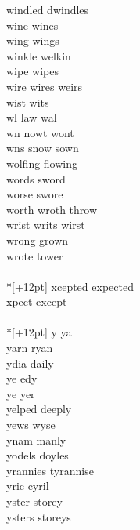 windled dwindles \\
wine wines \\
wing wings \\
winkle welkin\\
wipe wipes \\
wire wires weirs \\
wist wits\\
wl law wal \\
wn nowt wont  \\
wns snow sown \\
wolfing flowing\\
words sword\\
worse swore\\
worth wroth throw\\
wrist writs wirst\\
wrong grown\\
wrote tower\\

\vspace{14pt}
\noindent\notextbf{\LargeX}\\*[+12pt]
xcepted expected \\
xpect except \\

\vspace{14pt}
\noindent\notextbf{\LargeY}\\*[+12pt]
y ya \\
yarn ryan\\
ydia daily \\
ye edy \\
ye yer \\
yelped deeply\\
yews wyse\\
ynam manly \\
yodels doyles\\
yrannies tyrannise \\
yric cyril \\
yster storey \\
ysters storeys \\
